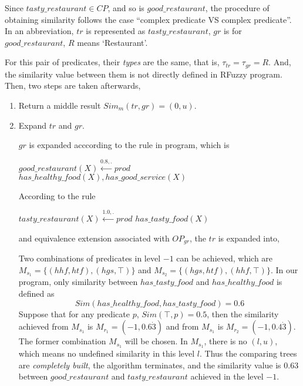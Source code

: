 \begin{itemize}
Since $tasty\_restaurant \in CP$, and so is $good\_restaurant$, the procedure of obtaining similarity follows the case ``complex predicate VS complex predicate''.
In an abbreviation, $tr$ is represented as $tasty\_restaurant$, $gr$ is for $good\_restaurant$, $R$ means `Restaurant'.

For this pair of predicates, their \textit{types} are the same, that is, $\tau_{tr}=\tau_{gr}=R$. And, the similarity value between them is not directly defined in RFuzzy program. Then, two steps are taken afterwards,
\begin{enumerate}
 \item Return a middle result $Sim_{m}(tr,gr)=(0,u)$.
 \item Expand $tr$ and $gr$. 
      
       $gr$ is expanded acccording to the rule in program, which is 
      \begin{center}
       $good\_restaurant(X) \stackrel{0.8,.}{\longleftarrow} prod$ $has\_healthy\_food(X), has\_good\_service(X)$ 
      \end{center}
      According to the rule
      \begin{center}
         $tasty\_restaurant(X) \stackrel{1.0,.}{\longleftarrow} prod$ $has\_tasty\_food(X)$
      \end{center}
      and equivalence extension associated with $OP_{gr}$, the $tr$ is expanded into,
      
       Two combinations of predicates in level $-1$ can be achieved, which are $M_{s_1}=\{(hhf,htf),(hgs,\top)\}$ and $M_{s_2}=\{(hgs,htf),(hhf,\top)\}$. In our program, only similarity between $has\_tasty\_food$ and $has\_healthy\_food$ is defined as \[Sim(has\_healthy\_food, has\_tasty\_food) = 0.6\]
       Suppose that for any predicate $p$, $Sim(\top,p)=0.5$, then the similarity achieved from $M_{s_1}$ is $M_{r_1}=(-1,0.6\dot{3})$ and from $M_{s_1}$ is $M_{r_2}=(-1,0.4\dot{3})$. The former combination $M_{s_1}$ will be chosen. In $M_{s_1}$, there is no $(l,u)$, which means no undefined similarity in this level $l$. Thus the comparing trees are \textit{completely built}, the algorithm terminates, and the similarity value is $0.63$ between $good\_restaurant$ and $tasty\_restaurant$ achieved in the level $-1$.
\end{enumerate}

\end{itemize}



